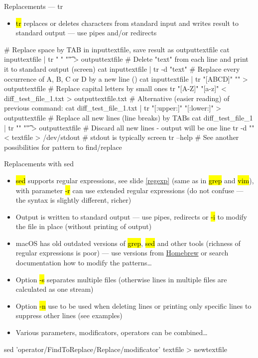 \documentclass[compress, ucs, xelatex, 11pt, xcolor=svgnames,
  hyperref={
    bookmarks=true,
    unicode=true,
    colorlinks=true,
    pdftitle={Linux, command line and MetaCentrum},
    plainpages=false,
    pdfauthor={Vojtech Zeisek},
    pdfsubject={Course about use of Linux command line, writing shell scripts and using MetaCentrum of CESNET},
    pdfcreator={XeLaTeX},
    pdfkeywords={Linux, GNU, BASH, shell, command line, MetaCentrum},
    linkcolor=DarkRed,
    anchorcolor=DarkBlue,
    citecolor=Indigo,
    filecolor=NavyBlue,
    menucolor=DarkMagenta,
    urlcolor=DarkBlue,
    pdftex},
  url={hyphens, lowtilde} %
  ]{beamer}
\renewcommand{\texttt}[1]{\hl{\ttfamily #1}}
\begin{document}
\begin{frame}[fragile]{Replacements --- tr}
  \begin{itemize}
    \item \texttt{tr} replaces or deletes characters from standard input and writes result to standard output --- use pipes and/or redirects
  \end{itemize}
  \begin{bashcode}
    # Replace space by TAB in inputtextfile, save result as outputtextfile
    cat inputtextfile | tr " " "\t" > outputtextfile
    # Delete "text" from each line and print it to standard output (screen)
    cat inputtextfile | tr -d "text"
    # Replace every occurrence of A, B, C or D by a new line (\n)
    cat inputtextfile | tr "[ABCD]" "\n" > outputtextfile
    # Replace capital letters by small ones
    tr "[A-Z]" "[a-z]" < diff_test_file_1.txt > outputtextfile.txt
    # Alternative (easier reading) of previous command:
    cat diff_test_file_1.txt | tr "[:upper:]" "[:lower:]" > outputtextfile
    # Replace all new lines (line breaks) by TABs
    cat diff_test_file_1 | tr "\n" "\t"  > outputtextfile
    # Discard all new lines - output will be one line
    tr -d "\n" < textfile > /dev/stdout # stdout is typically screen
    tr --help # See another possibilities for pattern to find/replace
  \end{bashcode}
\end{frame}

\begin{frame}[fragile]{Replacements with sed}
  \begin{itemize}
    \item \texttt{sed} supports regular expressions, see slide \ref{regexp} (same as in \texttt{grep} and \texttt{vim}), with parameter \texttt{-r} can use extended regular expressions (do not confuse --- the syntax is slightly different, richer)
    \item Output is written to standard output --- use pipes, redirects or \texttt{-i} to modify the file in place (without printing of output)
    \item macOS has old outdated versions of \texttt{grep}, \texttt{sed} and other tools (richness of regular expressions is poor) --- use versions from \href{http://brew.sh/}{Homebrew} or search documentation how to modify the patterns\ldots
    \item Option \texttt{-s} separates multiple files (otherwise lines in multiple files are calculated as one stream)
    \item Option \texttt{-n} use to be used when deleting lines or printing only specific lines to suppress other lines (see examples)
    \item Various parameters, modificators, operators can be combined\ldots
  \end{itemize}
  \begin{bashcode}
    sed 'operator/FindToReplace/Replace/modificator' textfile > newtextfile
  \end{bashcode}
  \vfill
\end{frame}
\end{document}
